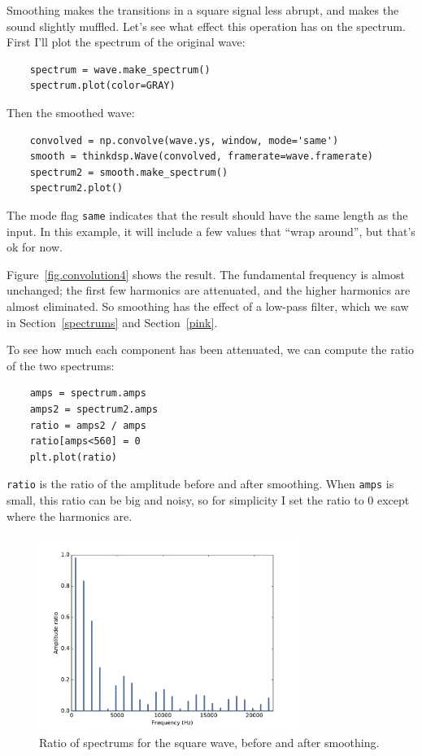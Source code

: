 \documentclass[12pt]{book}
\begin{document}
Smoothing makes the transitions in a square signal less abrupt,
and makes the sound slightly muffled.  Let's see what effect this
operation has on the spectrum.  First I'll plot the spectrum
of the original wave:

\begin{verbatim}
    spectrum = wave.make_spectrum()
    spectrum.plot(color=GRAY)
\end{verbatim}

Then the smoothed wave:

\begin{verbatim}
    convolved = np.convolve(wave.ys, window, mode='same')
    smooth = thinkdsp.Wave(convolved, framerate=wave.framerate)
    spectrum2 = smooth.make_spectrum()
    spectrum2.plot()
\end{verbatim}

The mode flag {\tt same} indicates that the result should have the
same length as the input.  In this example, it will include a few values
that ``wrap around'', but that's ok for now.

Figure~\ref{fig.convolution4} shows the result.  The fundamental
frequency is almost unchanged; the first few harmonics are
attenuated, and the higher harmonics are almost eliminated.  So
smoothing has the effect of a low-pass filter, which we
saw in Section~\ref{spectrums} and Section~\ref{pink}.

To see how much each component has been attenuated, we can
compute the ratio of the two spectrums:

\begin{verbatim}
    amps = spectrum.amps
    amps2 = spectrum2.amps
    ratio = amps2 / amps    
    ratio[amps<560] = 0
    plt.plot(ratio)
\end{verbatim}

{\tt ratio} is the ratio of the amplitude before and after 
smoothing.  When {\tt amps} is small, this ratio can be big
and noisy, so for simplicity I set the ratio to 0 except
where the harmonics are.

\begin{figure}
\centerline{\includegraphics[height=2.5in]{figs/convolution5.pdf}}
\caption{Ratio of spectrums for the square wave, before and after smoothing.}
\label{fig.convolution5}
\end{figure}
\end{document}
